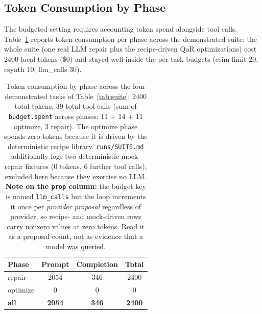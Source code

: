 \begin{table}[h]
\centering
\small
{}
\caption{Optimize QoR before $\rightarrow$ after using the recipe provider at 0
tokens. All three kernels reach II=1 via \texttt{ARRAY\_PARTITION cyclic factor=8
dim=1} on \texttt{in}; every accepted candidate re-passed C-simulation before
synthesis metrics were used.}
\label{tab:ppa}
\end{table}

\subsection{Token Consumption by Phase}\label{app:tokens}

The budgeted setting requires accounting token spend alongside tool calls.
Table~\ref{tab:tokens}
reports token consumption per phase across the demonstrated suite: the whole suite
(one real LLM repair plus the recipe-driven QoR optimizations) cost 2400 local
tokens (\$0) and stayed well inside the per-task budgets (csim limit 20, csynth 10,
llm\_calls 30).

\begin{table}[h]
\centering
\small
\begin{tabular}{@{}lccc@{}}
\toprule
Phase & Prompt & Completion & Total \\
\midrule
repair   & 2054 & 346 & 2400 \\
optimize & 0    & 0   & 0 \\
\textbf{all} & \textbf{2054} & \textbf{346} & \textbf{2400} \\
\bottomrule
\end{tabular}
\caption{Token consumption by phase across the four demonstrated tasks of
Table~\ref{tab:suite}: 2400 total tokens, 39 total tool calls (sum of
\texttt{budget.spent} across phases: 11 + 14 + 11 optimize, 3 repair). The
optimize phase spends zero tokens because it is driven by the deterministic
recipe library. \texttt{runs/SUITE.md} additionally logs two deterministic
mock-repair fixtures (0 tokens, 6 further tool calls), excluded here because
they exercise no LLM. \textbf{Note on the \texttt{prop} column:} the budget key
is named \texttt{llm\_calls} but the loop increments it once per \emph{provider
proposal} regardless of provider, so recipe- and mock-driven rows carry nonzero
values at zero tokens. Read it as a proposal count, not as evidence that a
model was queried.}
\label{tab:tokens}
\end{table}

